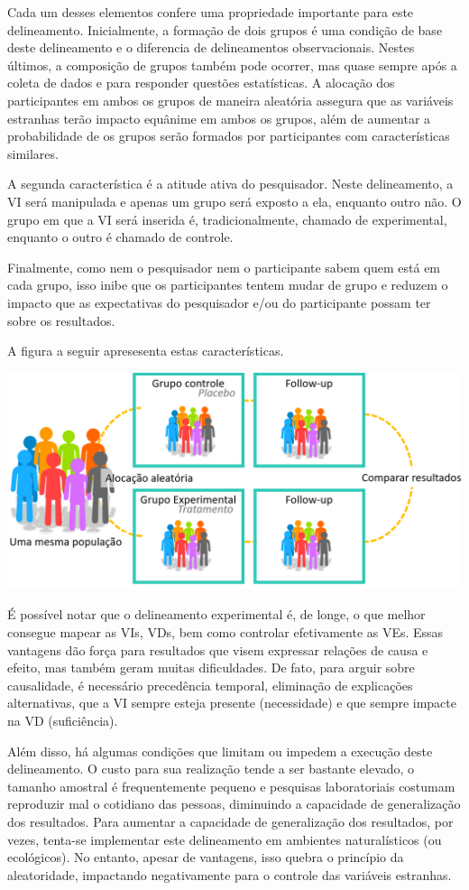 \documentclass[
]{book}
\begin{document}
Cada um desses elementos confere uma propriedade importante para este
delineamento. Inicialmente, a formação de dois grupos é uma condição de
base deste delineamento e o diferencia de delineamentos observacionais.
Nestes últimos, a composição de grupos também pode ocorrer, mas quase
sempre após a coleta de dados e para responder questões estatísticas. A
alocação dos participantes em ambos os grupos de maneira aleatória
assegura que as variáveis estranhas terão impacto equânime em ambos os
grupos, além de aumentar a probabilidade de os grupos serão formados por
participantes com características similares.

A segunda característica é a atitude ativa do pesquisador. Neste
delineamento, a VI será manipulada e apenas um grupo será exposto a ela,
enquanto outro não. O grupo em que a VI será inserida é,
tradicionalmente, chamado de experimental, enquanto o outro é chamado de
controle.

Finalmente, como nem o pesquisador nem o participante sabem quem está em
cada grupo, isso inibe que os participantes tentem mudar de grupo e
reduzem o impacto que as expectativas do pesquisador e/ou do
participante possam ter sobre os resultados.

A figura a seguir apresesenta estas características.

\includegraphics{./img/cap_experimento.png}

É possível notar que o delineamento experimental é, de longe, o que
melhor consegue mapear as VIs, VDs, bem como controlar efetivamente as
VEs. Essas vantagens dão força para resultados que visem expressar
relações de causa e efeito, mas também geram muitas dificuldades. De
fato, para arguir sobre causalidade, é necessário precedência temporal,
eliminação de explicações alternativas, que a VI sempre esteja presente
(necessidade) e que sempre impacte na VD (suficiência).

Além disso, há algumas condições que limitam ou impedem a execução deste
delineamento. O custo para sua realização tende a ser bastante elevado,
o tamanho amostral é frequentemente pequeno e pesquisas laboratoriais
costumam reproduzir mal o cotidiano das pessoas, diminuindo a capacidade
de generalização dos resultados. Para aumentar a capacidade de
generalização dos resultados, por vezes, tenta-se implementar este
delineamento em ambientes naturalísticos (ou ecológicos). No entanto,
apesar de vantagens, isso quebra o princípio da aleatoridade, impactando
negativamente para o controle das variáveis estranhas.
\end{document}
